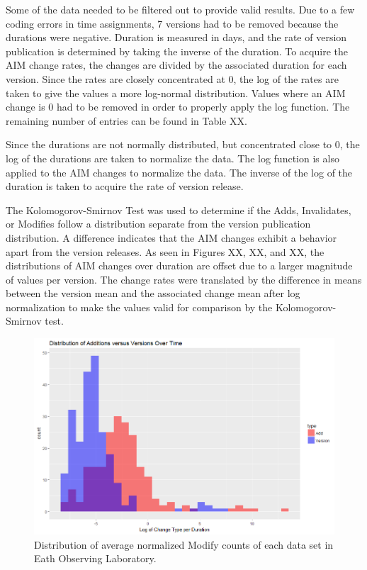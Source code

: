 Some of the data needed to be filtered out to provide valid results.  
Due to a few coding errors in time assignments, 7 versions had to be removed because the durations were negative.  
Duration is measured in days, and the rate of version publication is determined by taking the inverse of the duration.  
To acquire the AIM change rates, the changes are divided by the associated duration for each version.  
Since the rates are closely concentrated at 0, the log of the rates are taken to give the values a more log-normal distribution.  
Values where an AIM change is 0 had to be removed in order to properly apply the log function.  
The remaining number of entries can be found in Table XX.

Since the durations are not normally distributed, but concentrated close to 0, the log of the durations are taken to normalize the data.  
The log function is also applied to the AIM changes to normalize the data.  
The inverse of the log of the duration is taken to acquire the rate of version release.

The Kolomogorov-Smirnov Test was used to determine if the Adds, Invalidates, or Modifies follow a distribution separate from the version publication distribution.  
A difference indicates that the AIM changes exhibit a behavior apart from the version releases.  
As seen in Figures XX, XX, and XX, the distributions of AIM changes over duration are offset due to a larger magnitude of values per version.  
The change rates were translated by the difference in means between the version mean and the associated change mean after log normalization to make the values valid for comparison by the Kolomogorov-Smirnov test.


\begin{figure}%
	\centering
	\includegraphics[scale=.6]{figures/Eol_Add_Ver_Rate.png}
	\caption{Distribution of average normalized Modify counts of each data set in Eath Observing Laboratory.}
	\label{EOL_Add_Ver}
\end{figure}

